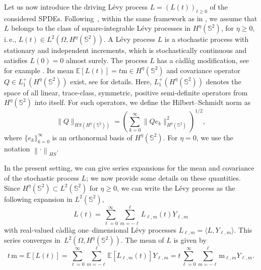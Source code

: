\documentclass[11pt]{amsart}
\newcommand{\E}{{\mathbb E}}
\newcommand{\IS}{\mathbb{S}}
\providecommand{\norm}[1]{\left\lVert#1\right\rVert}
\newcommand{\realSH}{{Y}}
\newcommand{\mean}{\mathrm{m}}
\begin{document}
Let us now introduce the driving L\'evy process $L=(L(t))_{t\geq 0}$ of the considered SPDEs. Following~\cite[Definition 4.1]{peszat2007}, within the same framework as in \cite{papi2025}, we assume that $L$ belongs to the class of square-integrable L\'evy  processes in $H^\eta(\IS^2)$, for $\eta\geq 0$, i.\,e., $L(t) \in L^2(\Omega,H^\eta(\IS^2))$. 
A L\'evy process $L$ is a stochastic process with stationary and independent increments, which is stochastically continuous and satisfies $L(0)=0$ almost surely. The process $L$ has a càdlàg modification, see for example \cite[Theorem 4.3]{peszat2007}.
Its mean $\E\left[L(t)\right] = t \mean \in H^\eta(\IS^2)$ and covariance operator $Q \in L^+_1(H^\eta(\IS^2))$ exist, see \cite[Theorem 4.4]{peszat2007} for details. Here,  $L^+_1(H^\eta(\IS^2))$ denotes the space of all linear, trace-class, symmetric, positive semi-definite operators from $H^\eta(\IS^2)$ into itself. For such operators, we define the Hilbert--Schmidt norm as
$$
\| Q \|_{HS(H^\eta(\IS^2))}=\left( \sum_{k=0}^\infty 
\| Qe_k\|^2_{H^\eta(\IS^2)} \right)^{1/2},
$$
where $\{e_k\}_{k=0}^\infty$ is an orthonormal basis of $H^\eta(\IS^2)$. 
For $\eta=0$, we use the notation $\norm{\cdot}_{HS}$.

In the present setting, we can give series expansions for the mean and covariance of the stochastic process $L$; we now provide some details on these quantities. Since $H^\eta(\IS^2) \subset L^2(\IS^2)$ for $\eta \ge 0$, we can write
the L\'evy process as the following expansion in $L^2({\IS^{2}})$,
 \begin{equation}\label{eq:KL-expansion_Levy}
	L(t) = \sum_{\ell=0}^\infty \sum_{m=-\ell}^\ell  L_{\ell,m}(t)Y_{\ell,m}
\end{equation}
with real-valued c\`{a}dl\`{a}g one--dimensional L\'evy processes $L_{\ell,m} = \langle L, Y_{\ell,m}\rangle$.
This series converges in~$L^2(\Omega,H^\eta(\IS^2))$.
The mean of $L$ is given by
\begin{equation*}
	t \, \mean = \E\left[L(t)\right]
		= \sum_{\ell=0}^\infty \sum_{m=-\ell}^\ell \E\left[L_{\ell,m}(t)\right] \realSH_{\ell,m}
		= t \sum_{\ell=0}^\infty \sum_{m=-\ell}^\ell \mean_{\ell,m} \realSH_{\ell,m}.
\end{equation*}
\end{document}
